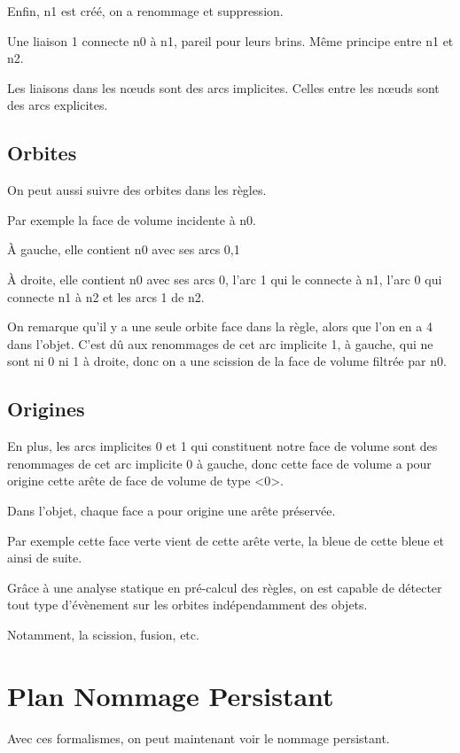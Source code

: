 \documentclass[11pt]{article}
\begin{document}
Enfin, n1 est créé, on a renommage et suppression.

Une liaison 1 connecte n0 à n1, pareil pour leurs brins.
Même principe entre n1 et n2.

Les liaisons dans les nœuds sont des arcs implicites.
Celles entre les nœuds sont des arcs explicites.

\subsection{Orbites}
\label{sec:orgcf72bd7}

On peut aussi suivre des orbites dans les règles.

Par exemple la face de volume incidente à n0.

À gauche, elle contient n0 avec ses arcs 0,1

À droite, elle contient n0 avec ses arcs 0, l'arc 1 qui le connecte à
n1, l'arc 0 qui connecte n1 à n2 et les arcs 1 de n2.

On remarque qu'il y a une seule orbite face dans la règle, alors que l'on en a 4
dans l'objet. %
C'est dû aux renommages de cet arc implicite 1, à gauche, qui ne sont ni 0
ni 1 à droite, donc on a une scission de la face de volume filtrée par n0.

\subsection{Origines}
\label{sec:org341560c}

En plus, les arcs implicites 0 et 1 qui constituent notre face de volume sont
des renommages de cet arc implicite 0 à gauche, donc cette face de volume a pour
origine cette arête de face de volume de type <0>. %

Dans l'objet, chaque face a pour origine une arête préservée.

Par exemple cette face verte vient de cette arête verte, la bleue de cette bleue et
ainsi de suite.

Grâce à une analyse statique en pré-calcul des règles, on est capable de
détecter tout type d'évènement sur les orbites indépendamment des objets.

Notamment, la scission, fusion, etc.
\section{Plan Nommage Persistant}
\label{sec:orgaa5036e}

Avec ces formalismes, on peut maintenant voir le nommage persistant.
\end{document}
